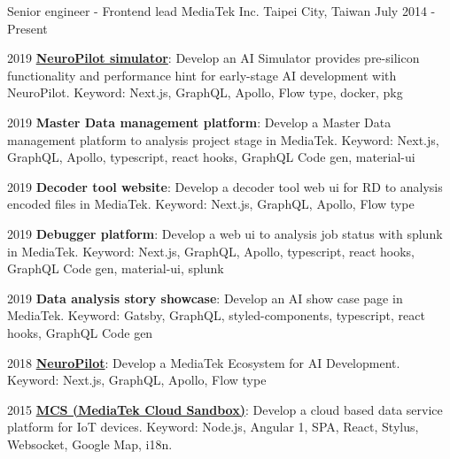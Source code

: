 

\begin{cventries}

  \cventry
    {Senior engineer - Frontend lead} %
    {MediaTek Inc.} %
    {Taipei City, Taiwan} %
    {July 2014 - Present} %
    {
      \begin{cvitems} %
        \item {2019 \href{https://neuropilot.mediatek.com/}{\textbf{NeuroPilot simulator}}: Develop an AI Simulator provides pre-silicon functionality and performance hint for early-stage AI development with NeuroPilot. Keyword: Next.js, GraphQL, Apollo, Flow type, docker, pkg}
        \item {2019 \textbf{Master Data management platform}: Develop a Master Data management platform to analysis project stage in MediaTek. Keyword: Next.js, GraphQL, Apollo, typescript, react hooks, GraphQL Code gen, material-ui}
        \item {2019 \textbf{Decoder tool website}: Develop a decoder tool web ui for RD to analysis encoded files in MediaTek. Keyword: Next.js, GraphQL, Apollo, Flow type}
        \item {2019 \textbf{Debugger platform}: Develop a web ui to analysis job status with splunk in MediaTek. Keyword: Next.js, GraphQL, Apollo, typescript, react hooks, GraphQL Code gen, material-ui, splunk}
        \item {2019 \textbf{Data analysis story showcase}: Develop an AI show case page in MediaTek. Keyword: Gatsby, GraphQL, styled-components, typescript, react hooks, GraphQL Code gen}
        \item {2018 \href{https://neuropilot.mediatek.com/}{\textbf{NeuroPilot}}: Develop a MediaTek Ecosystem for AI Development. Keyword: Next.js, GraphQL, Apollo, Flow type}
        \item {2015 \href{https://mcs.mediatek.com}{\textbf{MCS (MediaTek Cloud Sandbox)}}: Develop a cloud based data service platform for IoT devices. Keyword: Node.js, Angular 1, SPA, React, Stylus, Websocket, Google Map, i18n.}

\end{cvitems}}
\end{cventries}
